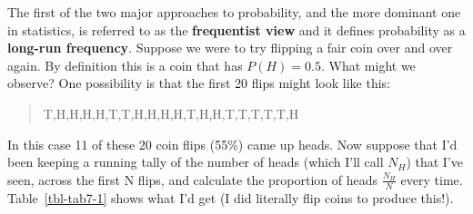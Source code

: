 \documentclass[
  a4paper,
]{book}
\begin{document}
The first of the two major approaches to probability, and the more
dominant one in statistics, is referred to as the \textbf{frequentist
view} and it defines probability as a \textbf{long-run frequency}.
Suppose we were to try flipping a fair coin over and over again. By
definition this is a coin that has \(P(H) = 0.5\). What might we
observe? One possibility is that the first 20 flips might look like
this:

\begin{quote}
T,H,H,H,H,T,T,H,H,H,H,T,H,H,T,T,T,T,T,H
\end{quote}

In this case 11 of these 20 coin flips (55\%) came up heads. Now suppose
that I'd been keeping a running tally of the number of heads (which I'll
call \(N_H\)) that I've seen, across the first N flips, and calculate
the proportion of heads \(\frac{N_H}{N}\) every time.
Table~\ref{tbl-tab7-1} shows what I'd get (I did literally flip coins to
produce this!).

\hypertarget{tbl-tab7-1}{}
 
  \providecommand{\huxb}[2]{\arrayrulecolor[RGB]{#1}\global\arrayrulewidth=#2pt}
  \providecommand{\huxvb}[2]{\color[RGB]{#1}\vrule width #2pt}
  \providecommand{\huxtpad}[1]{\rule{0pt}{#1}}
  \providecommand{\huxbpad}[1]{\rule[-#1]{0pt}{#1}}
\end{document}
